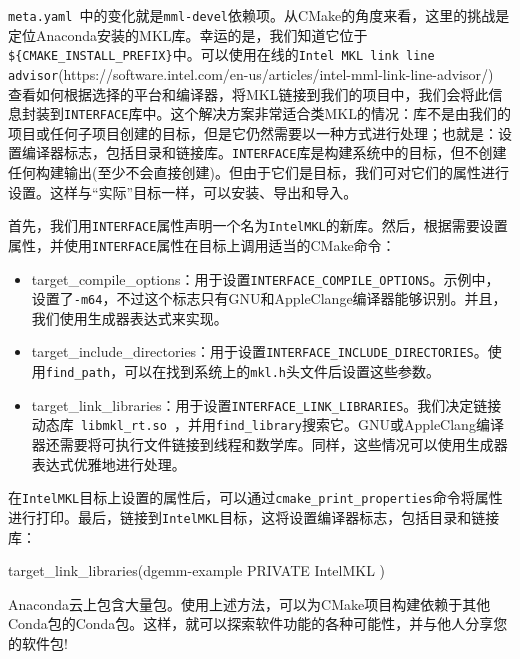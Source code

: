 
\texttt{meta.yaml }中的变化就是\texttt{mml-devel}依赖项。从CMake的角度来看，这里的挑战是定位Anaconda安装的MKL库。幸运的是，我们知道它位于\texttt{\$\{CMAKE\_INSTALL\_PREFIX\}}中。可以使用在线的\texttt{Intel MKL link line advisor}(https://software.intel.com/en-us/articles/intel-mml-link-line-advisor/) 查看如何根据选择的平台和编译器，将MKL链接到我们的项目中，我们会将此信息封装到\texttt{INTERFACE}库中。这个解决方案非常适合类MKL的情况：库不是由我们的项目或任何子项目创建的目标，但是它仍然需要以一种方式进行处理；也就是：设置编译器标志，包括目录和链接库。\texttt{INTERFACE}库是构建系统中的目标，但不创建任何构建输出(至少不会直接创建)。但由于它们是目标，我们可对它们的属性进行设置。这样与“实际”目标一样，可以安装、导出和导入。

首先，我们用\texttt{INTERFACE}属性声明一个名为\texttt{IntelMKL}的新库。然后，根据需要设置属性，并使用\texttt{INTERFACE}属性在目标上调用适当的CMake命令：

\begin{itemize}
\item target\_compile\_options：用于设置\texttt{INTERFACE\_COMPILE\_OPTIONS}。示例中，设置了\texttt{-m64}，不过这个标志只有GNU和AppleClange编译器能够识别。并且，我们使用生成器表达式来实现。

\item target\_include\_directories：用于设置\texttt{INTERFACE\_INCLUDE\_DIRECTORIES}。使用\texttt{find\_path}，可以在找到系统上的\texttt{mkl.h}头文件后设置这些参数。

\item target\_link\_libraries：用于设置\texttt{INTERFACE\_LINK\_LIBRARIES}。我们决定链接动态库\texttt{ libmkl\_rt.so }，并用\texttt{find\_library}搜索它。GNU或AppleClang编译器还需要将可执行文件链接到线程和数学库。同样，这些情况可以使用生成器表达式优雅地进行处理。

\end{itemize}

在\texttt{IntelMKL}目标上设置的属性后，可以通过\texttt{cmake\_print\_properties}命令将属性进行打印。最后，链接到\texttt{IntelMKL}目标，这将设置编译器标志，包括目录和链接库：

\begin{codebox}[cmake]
target_link_libraries(dgemm-example
  PRIVATE
    IntelMKL
  )
\end{codebox}


Anaconda云上包含大量包。使用上述方法，可以为CMake项目构建依赖于其他Conda包的Conda包。这样，就可以探索软件功能的各种可能性，并与他人分享您的软件包!


